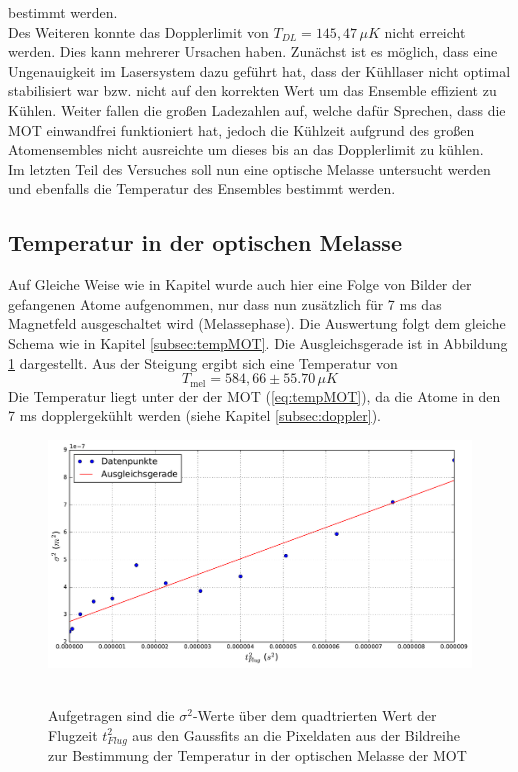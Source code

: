 \documentclass[twoside,colorback,accentcolor=tud4c,11pt]{tudreport}
\begin{document}
bestimmt werden.\\
Des Weiteren konnte das Dopplerlimit von $T_{DL}=145,47\,\si{\mu K}$ \cite{limit} nicht erreicht werden. Dies kann mehrerer Ursachen haben. Zunächst ist es möglich, dass eine Ungenauigkeit im Lasersystem dazu geführt hat, dass der Kühllaser nicht optimal stabilisiert war bzw. nicht auf den korrekten Wert um das Ensemble effizient zu Kühlen. Weiter fallen die großen Ladezahlen auf, welche dafür Sprechen, dass die MOT einwandfrei funktioniert hat, jedoch die Kühlzeit aufgrund des großen Atomensembles nicht ausreichte um dieses bis an das Dopplerlimit zu kühlen.\\
Im letzten Teil des Versuches soll nun eine optische Melasse untersucht werden und ebenfalls die Temperatur des Ensembles bestimmt werden.
\subsection{Temperatur in der optischen Melasse}
Auf Gleiche Weise wie in Kapitel \textit{} wurde auch hier eine Folge von Bilder der gefangenen Atome aufgenommen, nur dass nun zusätzlich für 7 ms das Magnetfeld ausgeschaltet wird (Melassephase). Die Auswertung folgt dem gleiche Schema wie in Kapitel \ref{subsec:tempMOT}. Die Ausgleichsgerade ist in Abbildung \ref{tmel} dargestellt. Aus der Steigung ergibt sich eine Temperatur von
\begin{equation}
T_{\text{mel}}=584,66 \pm 55.70\,\mu \si{K}
\end{equation}
Die Temperatur liegt unter der der MOT (\ref{eq:tempMOT}), da die Atome in den 7 ms dopplergekühlt werden (siehe Kapitel \ref{subsec:doppler}).
\begin{figure}[H]
\centering
   	\begin{minipage}[b]{0.85\textwidth}
   	\includegraphics[width=\textwidth]{graphics/tempmel.pdf}\
   	\end{minipage}
\caption{Aufgetragen sind die $\sigma^2$-Werte über dem quadtrierten Wert der Flugzeit $t_{Flug}^2$ aus den Gaussfits an die Pixeldaten aus der Bildreihe zur Bestimmung der Temperatur in der optischen Melasse der MOT}\label{tmel}	
\end{figure}
\end{document}
